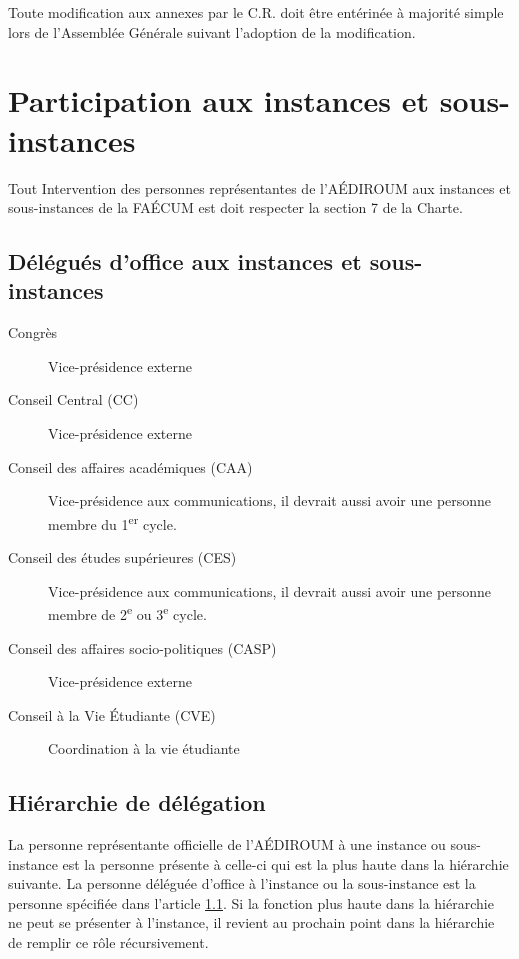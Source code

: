 \documentclass{aediroum}
\newcommand{\article}[1]{article \ref{#1}}
\begin{document}
Toute modification aux annexes par le C.R. doit être entérinée à majorité simple lors de l'Assemblée Générale suivant l'adoption de la modification.

\section{Participation aux instances et sous-instances}\label{sec:hierarchie-delegues-faecum}

Tout Intervention des personnes représentantes de l'AÉDIROUM aux instances et sous-instances de la FAÉCUM est doit respecter la section 7 de la Charte.

\subsection{Délégués d'office aux instances et sous-instances}\label{sec:delegues-doffice-instances}
\begin{description}
\item[Congrès] Vice-présidence externe
\item[Conseil Central (CC)] Vice-présidence externe
\item[Conseil des affaires académiques (CAA)] Vice-présidence aux communications, il devrait aussi avoir une personne membre du 1\textsuperscript{er} cycle.
\item[Conseil des études supérieures (CES)] Vice-présidence aux communications, il devrait aussi avoir une personne membre de 2\textsuperscript{e} ou 3\textsuperscript{e} cycle.
\item[Conseil des affaires socio-politiques (CASP)] Vice-présidence externe
\item[Conseil à la Vie Étudiante (CVE)] Coordination à la vie étudiante
\end{description}

\subsection{Hiérarchie de délégation}\label{sec:hierarchie-delegues-faecum}

La personne représentante officielle de l'AÉDIROUM à une instance ou sous-instance est la personne présente à celle-ci qui est la plus haute dans la hiérarchie suivante. La personne déléguée d'office à l'instance ou la sous-instance est la personne spécifiée dans l'\article{sec:delegues-doffice-instances}. Si la fonction plus haute dans la hiérarchie ne peut se présenter à l'instance, il revient au prochain point dans la hiérarchie de remplir ce rôle récursivement.
\end{document}
